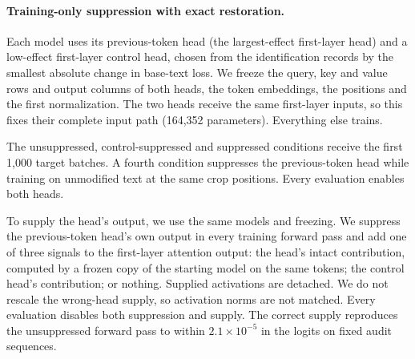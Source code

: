 \begin{table}[!htbp]
\centering\small
\caption{Per-seed circuit identification. Heads are layer.head. The
joint-ablation columns report distance-24 accuracy after zeroing the circuit or the
controls.}
\label{tab:circuits}
\end{table}

\paragraph{Training-only suppression with exact restoration.}
Each model uses its previous-token head (the largest-effect first-layer head) and a
low-effect first-layer control head, chosen from the identification records by the
smallest absolute change in base-text loss. We freeze the query, key and value rows
and output columns of both heads, the token embeddings, the positions and the first
normalization. The two heads receive the same first-layer inputs, so this fixes
their complete input path (164,352 parameters). Everything else trains.

The unsuppressed, control-suppressed and suppressed conditions receive the first
1,000 target batches. A fourth condition suppresses the previous-token head while
training on unmodified text at the same crop positions. Every evaluation enables
both heads.

To supply the head's output, we use the same models and freezing. We suppress the
previous-token head's own output in every training forward pass and add one of
three signals to the first-layer attention output: the head's intact contribution,
computed by a frozen copy of the starting model on the same tokens; the control
head's contribution; or nothing. Supplied activations are detached. We do not rescale
the wrong-head supply, so activation norms are not matched. Every evaluation
disables both suppression and supply. The correct supply reproduces the
unsuppressed forward pass to within $2.1\times10^{-5}$ in the logits on fixed audit
sequences.

